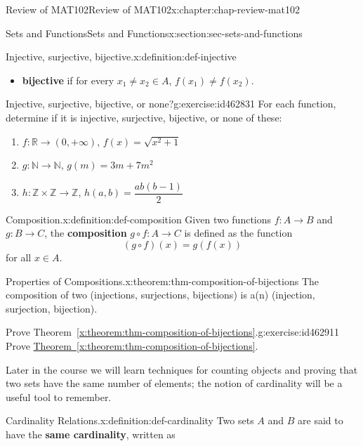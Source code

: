 \documentclass[oneside,10pt,]{book}
\newcommand{\xreffont}{\relax}
\newcommand{\terminology}[1]{\textbf{#1}}
\numberwithin{equation}{section}
\begin{document}
\begin{chapterptx}{Review of MAT102}{}{Review of MAT102}{}{}{x:chapter:chap-review-mat102}
\begin{sectionptx}{Sets and Functions}{}{Sets and Functions}{}{}{x:section:sec-sets-and-functions}
\begin{definition}{Injective, surjective, bijective.}{x:definition:def-injective}
\begin{itemize}[label=\textbullet]
\item{}\terminology{bijective} if for every \(x_1 \ne x_2 \in A\), \(f(x_1) \ne f(x_2)\).%
\end{itemize}
%
\end{definition}
\begin{inlineexercise}{Injective, surjective, bijective, or none?}{g:exercise:id462831}%
For each function, determine if it is injective, surjective, bijective, or none of these:%
%
\begin{enumerate}[label=(\alph*)]
\item{}\(f: \mathbb{R} \rightarrow (0,+\infty)\), \(f(x) = \sqrt{x^2+1}\)%
\item{}\(g: \mathbb{N} \rightarrow \mathbb{N}\), \(g(m) = 3m + 7m^2\)%
\item{}\(h: \mathbb{Z} \times \mathbb{Z} \rightarrow \mathbb{Z}\), \(h(a,b) = \dfrac{ab(b-1)}{2}\)%
\end{enumerate}
\end{inlineexercise}
\begin{definition}{Composition.}{x:definition:def-composition}%
\label{g:notation:id462867} Given two functions \(f: A \rightarrow B\) and \(g: B \rightarrow C\), the \terminology{composition} \(g \circ f: A \rightarrow C\) is defined as the function%
\begin{equation*}
(g \circ f)(x) = g(f(x))
\end{equation*}
for all \(x \in A\).%
\end{definition}
\begin{theorem}{Properties of Compositions.}{}{x:theorem:thm-composition-of-bijections}%
The composition of two (injections, surjections, bijections) is a(n) (injection, surjection, bijection).%
\end{theorem}
\begin{inlineexercise}{Prove Theorem~{\xreffont\ref*{x:theorem:thm-composition-of-bijections}}.}{g:exercise:id462911}%
Prove \hyperref[x:theorem:thm-composition-of-bijections]{Theorem~{\xreffont\ref{x:theorem:thm-composition-of-bijections}}}.%
\end{inlineexercise}
Later in the course we will learn techniques for counting objects and proving that two sets have the same number of elements; the notion of cardinality will be a useful tool to remember.%
\begin{definition}{Cardinality Relations.}{x:definition:def-cardinality}%
\label{g:notation:id462943}\label{g:notation:id462919} Two sets \(A\) and \(B\) are said to have the \terminology{same cardinality}, written as%

\end{definition}
\end{sectionptx}
\end{chapterptx}
\end{document}
